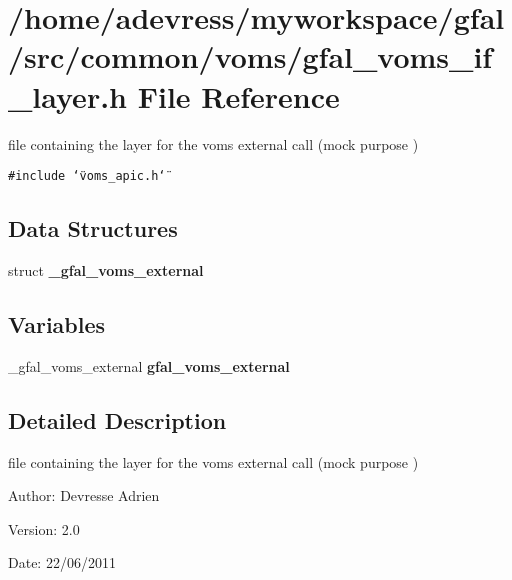 \section{/home/adevress/myworkspace/gfal/src/common/voms/gfal\_\-voms\_\-if\_\-layer.h File Reference}
\label{gfal__voms__if__layer_8h}
file containing the layer for the voms external call (mock purpose ) 

{\tt \#include \char`\"{}voms\_\-apic.h\char`\"{}}\par
\subsection*{Data Structures}
\begin{CompactItemize}
\item 
struct \textbf{\_\-gfal\_\-voms\_\-external}
\end{CompactItemize}
\subsection*{Variables}
\begin{CompactItemize}
\item 
\_\-gfal\_\-voms\_\-external \textbf{gfal\_\-voms\_\-external}\label{gfal__voms__if__layer_8h_890046619fb244fa8211a02b14588af6}

\end{CompactItemize}


\subsection{Detailed Description}
file containing the layer for the voms external call (mock purpose ) 

\begin{Desc}
\item[Author:]Devresse Adrien \end{Desc}
\begin{Desc}
\item[Version:]2.0 \end{Desc}
\begin{Desc}
\item[Date:]22/06/2011 \end{Desc}
